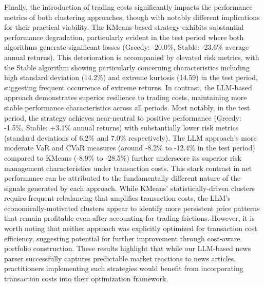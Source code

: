 
Finally, the introduction of trading costs significantly impacts the performance metrics of both clustering approaches, though with notably different implications for their practical viability. The KMeans-based strategy exhibits substantial performance degradation, particularly evident in the test period where both algorithms generate significant losses (Greedy: -20.0\%, Stable: -23.6\% average annual returns). This deterioration is accompanied by elevated risk metrics, with the Stable algorithm showing particularly concerning characteristics including high standard deviation (14.2\%) and extreme kurtosis (14.59) in the test period, suggesting frequent occurrence of extreme returns.
In contrast, the LLM-based approach demonstrates superior resilience to trading costs, maintaining more stable performance characteristics across all periods. Most notably, in the test period, the strategy achieves near-neutral to positive performance (Greedy: -1.5\%, Stable: +3.1\% annual returns) with substantially lower risk metrics (standard deviations of 6.2\% and 7.0\% respectively). The LLM approach's more moderate VaR and CVaR measures (around -8.2\% to -12.4\% in the test period) compared to KMeans (-8.9\% to -28.5\%) further underscore its superior risk management characteristics under transaction costs.
This stark contrast in net performance can be attributed to the fundamentally different nature of the signals generated by each approach. While KMeans' statistically-driven clusters require frequent rebalancing that amplifies transaction costs, the LLM's economically-motivated clusters appear to identify more persistent price patterns that remain profitable even after accounting for trading frictions. However, it is worth noting that neither approach was explicitly optimized for transaction cost efficiency, suggesting potential for further improvement through cost-aware portfolio construction. These results highlight that while our LLM-based news parser successfully captures predictable market reactions to news articles, practitioners implementing such strategies would benefit from incorporating transaction costs into their optimization framework.

